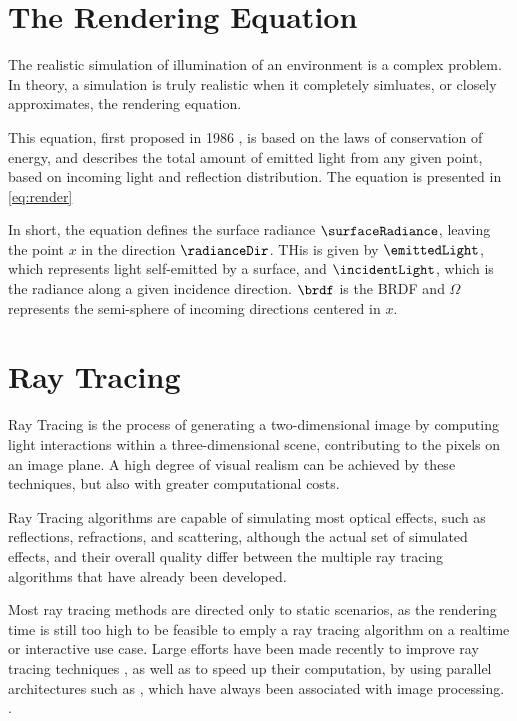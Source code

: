 \documentclass[main.tex]{subfiles}
\begin{document}
\section{The Rendering Equation}

The realistic simulation of illumination of an environment is a complex problem. In theory, a simulation is truly realistic when it completely simluates, or closely approximates, the rendering equation.

This equation, first proposed in 1986 \cite{kajiya1986rendering}, is based on the laws of conservation of energy, and describes the total amount of emitted light from any given point, based on incoming light and reflection distribution. The equation is presented in \cref{eq:render}


In short, the equation defines the surface radiance $\surfaceRadiance$, leaving the point $x$ in the direction $\radianceDir$. THis is given by $\emittedLight$, which represents light self-emitted by a surface, and $\incidentLight$, which is the radiance along a given incidence direction. $\brdf$ is the \acf{BRDF} and $\Omega$ represents the semi-sphere of incoming directions centered in $x$.


\section{Ray Tracing} \label{section:ray_tracing}

Ray Tracing is the process of generating a two-dimensional image by computing light interactions within a three-dimensional scene, contributing to the pixels on an image plane. A high degree of visual realism can be achieved by these techniques, but also with greater computational costs.

Ray Tracing algorithms are capable of simulating most optical effects, such as reflections, refractions, and scattering, although the actual set of simulated effects, and their overall quality differ between the multiple ray tracing algorithms that have already been developed.

Most ray tracing methods are directed only to static scenarios, as the rendering time is still too high to be feasible to emply a ray tracing algorithm on a realtime or interactive use case.
Large efforts have been made recently to improve ray tracing techniques , as well as to speed up their computation, by using parallel architectures such as \gpus, which have always been associated with image processing. .
\end{document}
